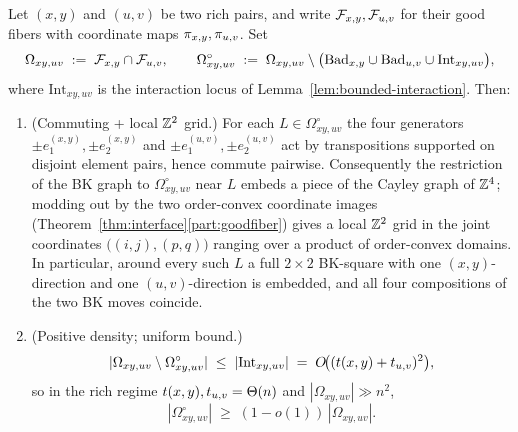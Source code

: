 \begin{corollary}\label{cor:overlap}
Let $(x,y)$ and $(u,v)$ be two rich pairs, and write $\mathcal{F}_{x,y},\mathcal{F}_{u,v}$ for
their good fibers with coordinate maps $\pi_{x,y},\pi_{u,v}$.
Set
\[
\Omega_{xy,uv} \;:=\; \mathcal{F}_{x,y} \cap \mathcal{F}_{u,v},
\qquad
\Omega^{\circ}_{xy,uv}
\;:=\; \Omega_{xy,uv}\setminus
\bigl(\mathrm{Bad}_{x,y}\cup\mathrm{Bad}_{u,v}\cup\mathrm{Int}_{xy,uv}\bigr),
\]
where $\mathrm{Int}_{xy,uv}$ is the interaction locus of
Lemma~\ref{lem:bounded-interaction}. Then:
\begin{enumerate}[label=\textup{(\alph*)},nosep]
\item\label{it:commute} \textup{(Commuting + local $\mathbb{Z}^2$ grid.)}
For each $L\in\Omega^{\circ}_{xy,uv}$ the four generators
$\pm e_1^{(x,y)},\pm e_2^{(x,y)}$ and $\pm e_1^{(u,v)},\pm e_2^{(u,v)}$
act by transpositions supported on disjoint element pairs, hence commute
pairwise. Consequently the restriction of the BK graph to
$\Omega^{\circ}_{xy,uv}$ near $L$ embeds a piece of the Cayley graph of
$\mathbb{Z}^4$; modding out by the two order-convex coordinate images
(Theorem~\ref{thm:interface}\ref{part:goodfiber}) gives a local
$\mathbb{Z}^2$ grid in the joint coordinates $\bigl((i,j),(p,q)\bigr)$
ranging over a product of order-convex domains. In particular, around
every such $L$ a full $2\times 2$ BK-square with one $(x,y)$-direction
and one $(u,v)$-direction is embedded, and all four compositions of
the two BK moves coincide.
\item\label{it:density} \textup{(Positive density; uniform bound.)}
\[
|\Omega_{xy,uv}\setminus\Omega^{\circ}_{xy,uv}|
\;\le\;|\mathrm{Int}_{xy,uv}|
\;=\;O\!\bigl((t(x,y)+t_{u,v})^{2}\bigr),
\]
so in the rich regime $t(x,y),t_{u,v}=\Theta(n)$ and
$|\Omega_{xy,uv}|\gg n^{2}$,
\[
|\Omega^{\circ}_{xy,uv}|\;\ge\;(1-o(1))\,|\Omega_{xy,uv}|.
\]
\end{enumerate}
\end{corollary}

